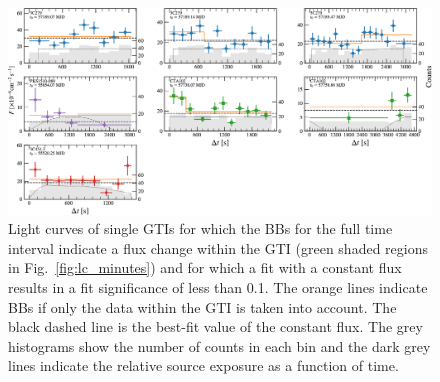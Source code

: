 \documentclass[twocolumn,linenumbers]{aastex62}
\begin{document}
\begin{figure}
\centering
\includegraphics[width = .95\linewidth]{figures/minute_lc_adaptive20.pdf}
\caption{Light curves of single GTIs for which the BBs for the full time interval indicate a flux change within the GTI (green shaded regions in Fig.~\ref{fig:lc_minutes}) and for which a fit with a constant flux results in a fit significance of less than 0.1. The orange lines indicate BBs if only the data within the GTI is taken into account. The black dashed line is the best-fit value of the constant flux. The grey histograms show the number of counts in each bin and the dark grey lines indicate the relative source exposure as a function of time. }
\label{fig:singel-gtis}
\end{figure}
\end{document}
